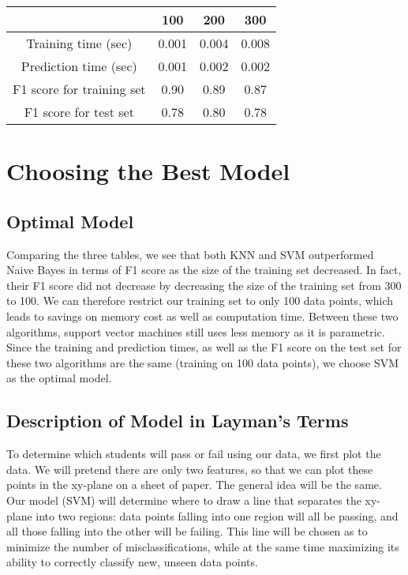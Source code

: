 \documentclass[12 pt]{article}
\numberwithin{equation}{section}
\begin{document}
\begin{center}
  \begin{tabular}{| c | c | c | c | }
    \hline
    & 100 & 200 & 300 \\ \hline
    Training time (sec) & 0.001 & 0.004 & 0.008 \\ \hline
    Prediction time (sec) & 0.001 & 0.002 & 0.002 \\ \hline 
    F1 score for training set & 0.90 & 0.89 & 0.87 \\ \hline
    F1 score for test set & 0.78 & 0.80 & 0.78 \\ \hline
  \end{tabular}
\end{center}

\section{Choosing the Best Model}
\subsection{Optimal Model}
Comparing the three tables, we see that both KNN and SVM outperformed Naive Bayes in terms of F1 score as the size of the training set decreased. In fact, their F1 score did not decrease by decreasing the size of the training set from 300 to 100. We can therefore restrict our training set to only 100 data points, which leads to savings on memory cost as well as computation time. Between these two algorithms, support vector machines still uses less memory as it is parametric. Since the training and prediction times, as well as the F1 score on the test set for these two algorithms are the same (training on 100 data points), we choose SVM as the optimal model.
\subsection{Description of Model in Layman's Terms}
To determine which students will pass or fail using our data, we first plot the data. We will pretend there are only two features, so that we can plot these points in the xy-plane on a sheet of paper. The general idea will be the same. Our model (SVM) will determine where to draw a line that separates the xy-plane into two regions: data points falling into one region will all be passing, and all those falling into the other will be failing. This line will be chosen as to minimize the number of misclassifications, while at the same time maximizing its ability to correctly classify new, unseen data points.
\end{document}
